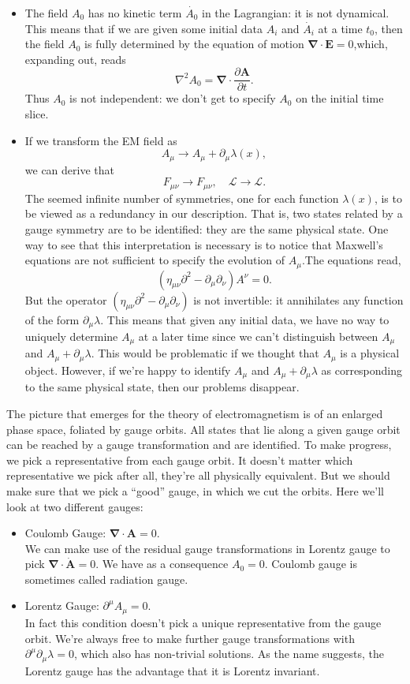 \begin{itemize}
\item The field $A_0$ has no kinetic term $\dot{A_0}$ in the Lagrangian: it is not dynamical. This means that if we are given some initial data $A_i$ and $\dot{A_i}$ at a time $t_0$, then the field $A_0$ is fully determined by the equation of motion $\bm{\nabla} \cdot \bm{E} = 0$,which, expanding out,
reads
\[\nabla^2 A_0 = \bm{\nabla} \cdot \frac{\partial \bm{A}}{\partial t}.\]
Thus $A_0$ is not independent: we don't get to specify $A_0$ on the initial time slice.
\item If we transform the EM field as
\[A_{\mu} \to A_{\mu} + \partial_{\mu}\lambda(x) ,\]
we can derive that
\[F_{\mu\nu} \to F_{\mu \nu} , \quad \mathcal{L} \to \mathcal{L}.\]
The seemed infinite number of symmetries, one for each function $\lambda(x)$, is to be viewed as a redundancy in our description. That is, two states related by a gauge symmetry are to be identified: they are the same physical state. One way to see that this interpretation is necessary is to notice that Maxwell's equations are not sufficient to specify the evolution of $A_{\mu}$.The equations read,
\[(\eta_{\mu\nu} \partial^2 - \partial_{\mu} \partial_{\nu}) A^{\nu} = 0.\]
But the operator $(\eta_{\mu\nu} \partial^2 - \partial_{\mu} \partial_{\nu})$ is not invertible: it annihilates any function of
the form $\partial_{\mu} \lambda$. This means that given any initial data, we have no way to uniquely determine $A_{\mu}$ at a later time since we can't distinguish between $A_{\mu}$ and $A_{\mu} + \partial_{\mu} \lambda$. This would be problematic if we thought that $A_{\mu}$ is a physical object. However, if we're happy to identify $A_{\mu}$ and $A_{\mu} + \partial_{\mu} \lambda$ as corresponding to the same physical state, then our problems disappear. 
\end{itemize}

\noindent
The picture that emerges for the theory of electromagnetism is of an enlarged phase space, foliated by gauge orbits. All states that lie along a given gauge orbit can be reached by a gauge transformation and are identified. To make progress, we pick a representative from each gauge orbit. It doesn't matter which representative we pick after all, they're all physically equivalent. But we should make sure that we pick a ``good'' gauge, in which we cut the orbits. Here we'll look at two different gauges:
\begin{itemize}
\item Coulomb Gauge: $\bm{\nabla} \cdot \bm{A} = 0$.
\\
We can make use of the residual gauge transformations in Lorentz gauge to pick $\bm{\nabla} \cdot \dot{\bm{A}} = 0$. We
have as a consequence $A_0 = 0$. Coulomb gauge is sometimes called radiation gauge.
\item Lorentz Gauge: $\partial^{\mu} A_{\mu} = 0$.
\\
In fact this condition doesn't pick a unique representative from the gauge orbit. We're always free to make further gauge transformations with $\partial^{\mu}\partial_{\mu} \lambda = 0$, which also has non-trivial solutions. As the name suggests, the Lorentz gauge has the advantage that it is Lorentz invariant.
\end{itemize}

